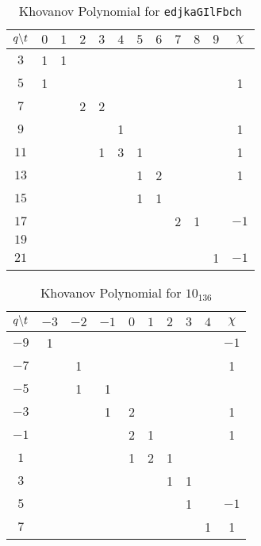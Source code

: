     \begin{table}
        \centering
        \begin{tabular}{| c | c | c | c | c | c | c | c | c | c | c | c |}
            \hline
            $q\symbol{92}t$&$0$&$1$&$2$&$3$&$4$&$5$&$6$&$7$&$8$&$9$&$\chi$\\
            \hline
            $3$&1&1&&&&&&&&&\\
            \hline
            $5$&1&&&&&&&&&&1\\
            \hline
            $7$&&&2&2&&&&&&&\\
            \hline
            $9$&&&&&1&&&&&&1\\
            \hline
            $11$&&&&1&3&1&&&&&1\\
            \hline
            $13$&&&&&&1&2&&&&1\\
            \hline
            $15$&&&&&&1&1&&&&\\
            \hline
            $17$&&&&&&&&2&1&&$-1$\\
            \hline
            $19$&&&&&&&&&&&\\
            \hline
            $21$&&&&&&&&&&1&$-1$\\
            \hline
        \end{tabular}
        \caption{Khovanov Polynomial for \texttt{edjkaGIlFbch}}
    \end{table}
    \begin{table}
        \centering
        \begin{tabular}{| c | c | c | c | c | c | c | c | c | c |}
            \hline
            $q\symbol{92}t$&$-3$&$-2$&$-1$&$0$&$1$&$2$&$3$&$4$&$\chi$\\
            \hline
            $-9$&1&&&&&&&&$-1$\\
            \hline
            $-7$&&1&&&&&&&1\\
            \hline
            $-5$&&1&1&&&&&&\\
            \hline
            $-3$&&&1&2&&&&&1\\
            \hline
            $-1$&&&&2&1&&&&1\\
            \hline
            $1$&&&&1&2&1&&&\\
            \hline
            $3$&&&&&&1&1&&\\
            \hline
            $5$&&&&&&&1&&$-1$\\
            \hline
            $7$&&&&&&&&1&1\\
            \hline
        \end{tabular}
        \caption{Khovanov Polynomial for $10_{136}$}
    \end{table}

